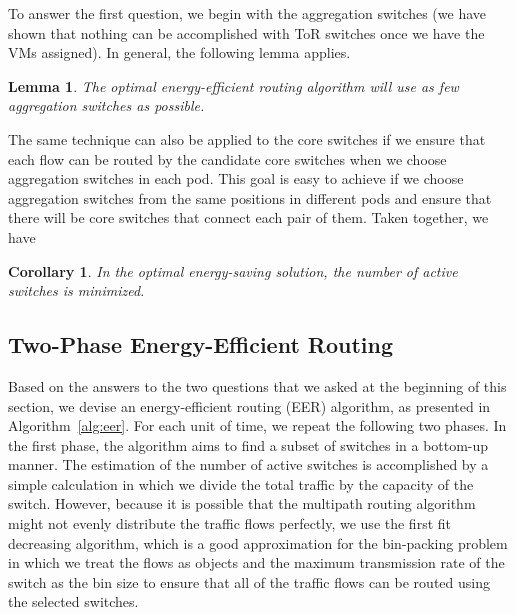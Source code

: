 \documentclass[journal,single-space,two column,twoside,10pt]{IEEEtran}
\newtheorem{lemma}{Lemma}
\newtheorem{corollary}{Corollary}
\begin{document}
To answer the first question, we begin with the aggregation switches (we have shown that nothing can be accomplished with ToR switches once we have the VMs assigned). In general, the following lemma applies.

\begin{lemma}
The optimal energy-efficient routing algorithm will use as few aggregation switches as possible.
\end{lemma}

The same technique can also be applied to the core switches if we ensure that each flow can be routed by the candidate core switches when we choose aggregation switches in each pod. This goal is easy to achieve if we choose aggregation switches from the same positions in different pods and ensure that there will be core switches that connect each pair of them. Taken together, we have
\begin{corollary}
\label{cor:eer}
In the optimal energy-saving solution, the number of active switches is minimized.
\end{corollary}

\subsection{Two-Phase Energy-Efficient Routing}

Based on the answers to the two questions that we asked at the beginning of this section, we devise an energy-efficient routing (EER) algorithm, as presented in Algorithm~\ref{alg:eer}. For each unit of time, we repeat the following two phases. In the first phase, the algorithm aims to find a subset of switches in a bottom-up manner. The estimation of the number of active switches is accomplished by a simple calculation in which we divide the total traffic by the capacity of the switch. However, because it is possible that the multipath routing algorithm might not evenly distribute the traffic flows perfectly, we use the first fit decreasing algorithm, which is a good approximation for the bin-packing problem in which we treat the flows as objects and the maximum transmission rate of the switch as the bin size to ensure that all of the traffic flows can be routed using the selected switches.
\end{document}
